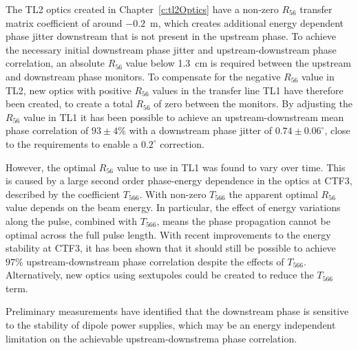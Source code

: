 The TL2 optics created in Chapter~\ref{c:tl2Optics} have a non-zero \(R_{56}\) transfer matrix coefficient of around \(-0.2\)~m, which creates additional energy dependent phase jitter downstream that is not present in the upstream phase. To achieve the necessary initial downstream phase jitter and upstream-downstream phase correlation, an absolute \(R_{56}\) value below 1.3~cm is required between the upstream and downstream phase monitors. To compensate for the negative \(R_{56}\) value in TL2, new optics with positive \(R_{56}\) values in the transfer line TL1 have therefore been created, to create a total \(R_{56}\) of zero between the monitors. By adjusting the \(R_{56}\) value in TL1 it has been possible to achieve an upstream-downstream mean phase correlation of \(93\pm4\%\) with a downstream phase jitter of \(0.74\pm0.06^\circ\), close to the requirements to enable a \(0.2^\circ\) correction.

However, the optimal \(R_{56}\) value to use in TL1 was found to vary over time. This is caused by a large second order phase-energy dependence in the optics at CTF3, described by the coefficient \(T_{566}\). With non-zero \(T_{566}\) the apparent optimal \(R_{56}\) value depends on the beam energy. In particular, the effect of energy variations along the pulse, combined with \(T_{566}\), means the phase propagation cannot be optimal across the full pulse length. With recent improvements to the energy stability at CTF3, it has been shown that it should still be possible to achieve \(97\%\) upstream-downstream phase correlation despite the effects of \(T_{566}\). Alternatively, new optics using sextupoles could be created to reduce the \(T_{566}\) term.

Preliminary measurements have identified that the downstream phase is sensitive to the stability of dipole power supplies, which may be an energy independent limitation on the achievable upstream-downstrema phase correlation.